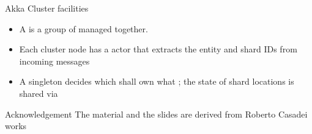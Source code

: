 \documentclass[presentation, 9pt]{beamer}\mode<presentation>{\usetheme{AMSBolognaFC}}
\begin{document}
\begin{frame}[c, fragile]{Akka Cluster facilities}
\begin{itemize}
 \begin{itemize}
	\item A  is a group of  managed together.
 	\item Each cluster node has a  actor that extracts the entity and shard IDs from incoming messages
 	\item A singleton  decides which  shall own what ; the
 state of shard locations is shared via 
 \end{itemize}
\end{itemize}
\end{frame}
\begin{frame}[c]{Acknowledgement}
	The material and the slides are derived from Roberto Casadei works \href{https://www.slideshare.net/RobertoCasadei/akka-actors-an-introduction}{\faLink}
\end{frame}
\section*{}

\end{document}
